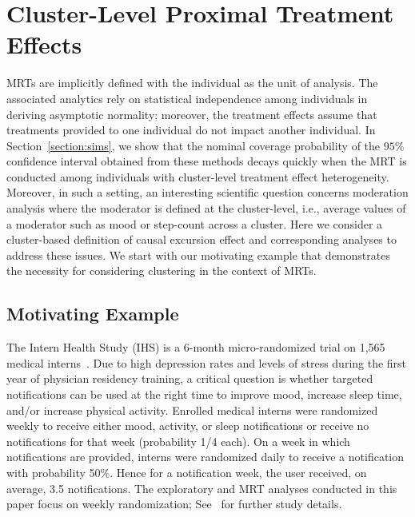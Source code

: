 \documentclass[12pt]{article}
\newcommand{\zw}[1]{\textcolor{blue}{[\textit{ZW: #1}]}}
\begin{document}
\section{Cluster-Level Proximal Treatment Effects}
\label{section:cond_effects}

MRTs are implicitly defined with the individual as the unit of analysis.  The associated analytics rely on statistical independence among individuals in deriving asymptotic normality; moreover, the treatment effects assume that treatments provided to one individual do not impact another individual. In Section~\ref{section:sims}, we show that the nominal coverage probability of the $95\%$ confidence interval obtained from these methods decays quickly when the MRT is conducted among individuals with cluster-level treatment effect heterogeneity.  Moreover, in such a setting, an interesting scientific question concerns moderation analysis where the moderator is defined at the cluster-level, i.e., average values of a moderator such as mood or step-count across a cluster.
Here we consider a cluster-based definition of causal excursion effect and corresponding analyses to address these issues. We start with our motivating example that demonstrates the necessity for considering clustering in the context of MRTs.

\subsection{Motivating Example}
\label{section:motex}

The Intern Health Study (IHS) is a 6-month micro-randomized trial on 1,565 medical interns~\citep{Necamp2020}.  Due to high depression rates and levels of stress during the first year of physician residency training, a critical question is whether targeted notifications can be used at the right time to improve mood, increase sleep time, and/or increase physical activity. Enrolled medical interns were randomized weekly to receive either mood, activity, or sleep notifications or receive no notifications for that week (probability 1/4 each).  On a week in which notifications are provided, interns were randomized daily to receive a notification with probability 50\%. Hence for a notification week, the user received, on average, 3.5 notifications. The exploratory and MRT analyses conducted in this paper focus on weekly randomization; See~\cite{Necamp2020} for further study details.
\end{document}
